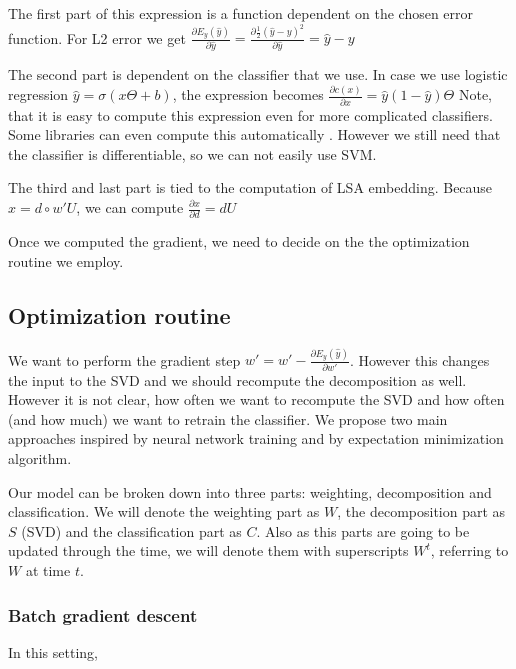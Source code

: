     The first part of this expression is a function dependent on the chosen error function. 
    For L2 error we get 
    $\frac{\partial E_y(\hat{y})}{\partial \hat{y}} = \frac{\partial \frac{1}{2}(\hat{y}-y)^2}{\partial \hat{y}} = \hat{y}-y$
    
    The second part is dependent on the classifier that we use. 
    In case we use logistic regression $\hat{y} = \sigma(x \Theta + b)$, the expression becomes
    $\frac{\partial c(x)}{\partial x} = \hat{y} (1-\hat{y}) \Theta$
    Note, that it is easy to compute this expression even for more complicated classifiers. 
    Some libraries can even compute this automatically \cite{tensorflow2015-whitepaper}.
    However we still need that the classifier is differentiable, so we can not easily use SVM. 
    
    The third and last part is tied to the computation of LSA embedding.
    Because $x = d \circ w' U$, we can compute 
    $\frac{\partial x}{\partial d} = d U$ \* %
    
    Once we computed the gradient, we need to decide on the the optimization routine we employ.
    
    \subsection{Optimization routine}
    
    We want to perform the gradient step $w' = w' - \frac{\partial E_y(\hat{y})}{\partial w'}$. 
    However this changes the input to the SVD and we should recompute the decomposition as well. 
    However it is not clear, how often we want to recompute the SVD and how often (and how much) we want to retrain the classifier.
    We propose two main approaches inspired by neural network training and by 
    expectation minimization algorithm. \* %
    
    Our model can be broken down into three parts: weighting, decomposition and classification.
    We will denote the weighting part as $W$, the decomposition part as $S$ (SVD) and the classification part as $C$.
    Also as this parts are going to be updated through the time, we will denote them with superscripts $W^t$, referring to $W$ at time $t$.
    
    \* %
    
    \subsubsection{Batch gradient descent}
    In this setting, 
    

